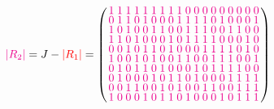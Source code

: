 \documentclass{beamer}
\newcommand{\rred}[1]{\textcolor{red}{#1}}
\newcommand{\mmag}[1]{\textcolor{magenta}{#1}}
\newcommand{\abs}[1]{|#1|}
\begin{document}
\begin{frame}

  \[
    \mmag{\abs{R_2}} = J-\rred{\abs{R_1}} =
    \left(
      \arraycolsep=1.25pt\def\arraystretch{0.625}
      \begin{array}{cccccccccccccccccc}
        \mmag{1}&\mmag{1}&\mmag{1}&\mmag{1}&\mmag{1}&\mmag{1}&\mmag{1}&\mmag{1}&\mmag{1}&\mmag{0}&\mmag{0}&\mmag{0}&\mmag{0}&\mmag{0}&\mmag{0}&\mmag{0}&\mmag{0}&\mmag{0}\\
        \mmag{0}&\mmag{1}&\mmag{1}&\mmag{0}&\mmag{1}&\mmag{0}&\mmag{0}&\mmag{0}&\mmag{1}&\mmag{1}&\mmag{1}&\mmag{1}&\mmag{0}&\mmag{1}&\mmag{0}&\mmag{0}&\mmag{0}&\mmag{1}\\
        \mmag{1}&\mmag{0}&\mmag{1}&\mmag{0}&\mmag{0}&\mmag{1}&\mmag{1}&\mmag{0}&\mmag{0}&\mmag{1}&\mmag{1}&\mmag{1}&\mmag{0}&\mmag{0}&\mmag{1}&\mmag{1}&\mmag{0}&\mmag{0}\\
        \mmag{1}&\mmag{1}&\mmag{0}&\mmag{1}&\mmag{0}&\mmag{0}&\mmag{0}&\mmag{1}&\mmag{0}&\mmag{1}&\mmag{1}&\mmag{1}&\mmag{1}&\mmag{0}&\mmag{0}&\mmag{0}&\mmag{1}&\mmag{0}\\
        \mmag{0}&\mmag{0}&\mmag{1}&\mmag{0}&\mmag{1}&\mmag{1}&\mmag{0}&\mmag{1}&\mmag{0}&\mmag{0}&\mmag{0}&\mmag{1}&\mmag{1}&\mmag{1}&\mmag{1}&\mmag{0}&\mmag{1}&\mmag{0}\\
        \mmag{1}&\mmag{0}&\mmag{0}&\mmag{1}&\mmag{0}&\mmag{1}&\mmag{0}&\mmag{0}&\mmag{1}&\mmag{1}&\mmag{0}&\mmag{0}&\mmag{1}&\mmag{1}&\mmag{1}&\mmag{0}&\mmag{0}&\mmag{1}\\
        \mmag{0}&\mmag{1}&\mmag{0}&\mmag{1}&\mmag{1}&\mmag{0}&\mmag{1}&\mmag{0}&\mmag{0}&\mmag{0}&\mmag{1}&\mmag{0}&\mmag{1}&\mmag{1}&\mmag{1}&\mmag{1}&\mmag{0}&\mmag{0}\\
        \mmag{0}&\mmag{1}&\mmag{0}&\mmag{0}&\mmag{0}&\mmag{1}&\mmag{0}&\mmag{1}&\mmag{1}&\mmag{0}&\mmag{1}&\mmag{0}&\mmag{0}&\mmag{0}&\mmag{1}&\mmag{1}&\mmag{1}&\mmag{1}\\
        \mmag{0}&\mmag{0}&\mmag{1}&\mmag{1}&\mmag{0}&\mmag{0}&\mmag{1}&\mmag{0}&\mmag{1}&\mmag{0}&\mmag{0}&\mmag{1}&\mmag{1}&\mmag{0}&\mmag{0}&\mmag{1}&\mmag{1}&\mmag{1}\\
        \mmag{1}&\mmag{0}&\mmag{0}&\mmag{0}&\mmag{1}&\mmag{0}&\mmag{1}&\mmag{1}&\mmag{0}&\mmag{1}&\mmag{0}&\mmag{0}&\mmag{0}&\mmag{1}&\mmag{0}&\mmag{1}&\mmag{1}&\mmag{1}\\
      \end{array}
    \right)
  \]
  
\end{frame}
\end{document}
